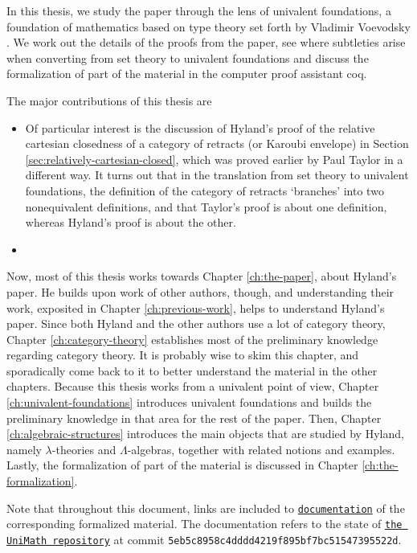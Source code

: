 In this thesis, we study the paper through the lens of univalent foundations, a foundation of mathematics based on type theory set forth by Vladimir Voevodsky \autocite{voevodsky-univalent-foundations}. We work out the details of the proofs from the paper, see where subtleties arise when converting from set theory to univalent foundations and discuss the formalization of part of the material in the computer proof assistant coq.

The major contributions of this thesis are
\begin{itemize}
  \item Of particular interest is the discussion of Hyland's proof of the relative cartesian closedness of a category of retracts (or Karoubi envelope) in Section \ref{sec:relatively-cartesian-closed}, which was proved earlier by Paul Taylor in a different way. It turns out that in the translation from set theory to univalent foundations, the definition of the category of retracts `branches' into two nonequivalent definitions, and that Taylor's proof is about one definition, whereas Hyland's proof is about the other.
  \item \TODO
\end{itemize}

Now, most of this thesis works towards Chapter \ref{ch:the-paper}, about Hyland's paper.
He builds upon work of other authors, though, and understanding their work, exposited in Chapter \ref{ch:previous-work}, helps to understand Hyland's paper.
Since both Hyland and the other authors use a lot of category theory, Chapter \ref{ch:category-theory} establishes most of the preliminary knowledge regarding category theory. It is probably wise to skim this chapter, and sporadically come back to it to better understand the material in the other chapters.
Because this thesis works from a univalent point of view, Chapter \ref{ch:univalent-foundations} introduces univalent foundations and builds the preliminary knowledge in that area for the rest of the paper.
Then, Chapter \ref{ch:algebraic-structures} introduces the main objects that are studied by Hyland, namely $ \lambda $-theories and $ \Lambda $-algebras, together with related notions and examples.
Lastly, the formalization of part of the material is discussed in Chapter \ref{ch:the-formalization}.

Note that throughout this document, links are included to \href{https://arnoudvanderleer.github.io/cs-masters-thesis/toc.html}{\nolinkurl{documentation}} of the corresponding formalized material. The documentation refers to the state of \href{https://github.com/UniMath/UniMath/tree/5eb5c8958c4dddd4219f895bf7bc51547395522d}{\texttt{the UniMath repository}} at commit \texttt{5eb5c8958c4dddd4219f895bf7bc51547395522d}.
